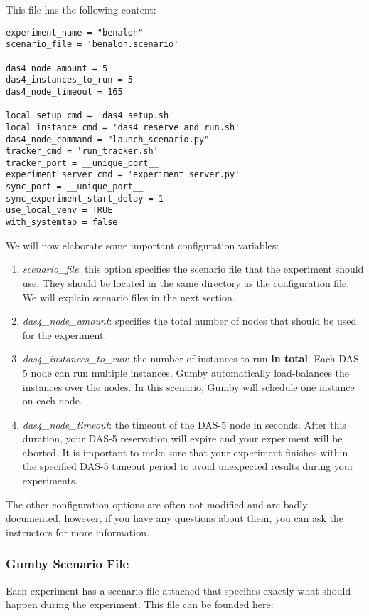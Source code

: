 \documentclass{article}
\begin{document}
This file has the following content:

\begin{lstlisting}[frame=single]
experiment_name = "benaloh"
scenario_file = 'benaloh.scenario'

das4_node_amount = 5
das4_instances_to_run = 5
das4_node_timeout = 165

local_setup_cmd = 'das4_setup.sh'
local_instance_cmd = 'das4_reserve_and_run.sh'
das4_node_command = "launch_scenario.py"
tracker_cmd = 'run_tracker.sh'
tracker_port = __unique_port__
experiment_server_cmd = 'experiment_server.py'
sync_port = __unique_port__
sync_experiment_start_delay = 1
use_local_venv = TRUE
with_systemtap = false
\end{lstlisting}

We will now elaborate some important configuration variables:
\begin{enumerate}
	\item \emph{scenario\_file}: this option specifies the scenario file that the experiment should use. They should be located in the same directory as the configuration file. We will explain scenario files in the next section.
	\item \emph{das4\_node\_amount}: specifies the total number of nodes that should be used for the experiment.
	\item \emph{das4\_instances\_to\_run}: the number of instances to run \textbf{in total}. Each DAS-5 node can run multiple instances. Gumby automatically load-balances the instances over the nodes. In this scenario, Gumby will schedule one instance on each node.
	\item \emph{das4\_node\_timeout}: the timeout of the DAS-5 node in seconds. After this duration, your DAS-5 reservation will expire and your experiment will be aborted. It is important to make sure that your experiment finishes within the specified DAS-5 timeout period to avoid unexpected results during your experiments.
\end{enumerate}

The other configuration options are often not modified and are badly documented, however, if you have any questions about them, you can ask the instructors for more information.

\subsubsection{Gumby Scenario File}
Each experiment has a scenario file attached that specifies exactly what should happen during the experiment.
This file can be founded here:
\end{document}
